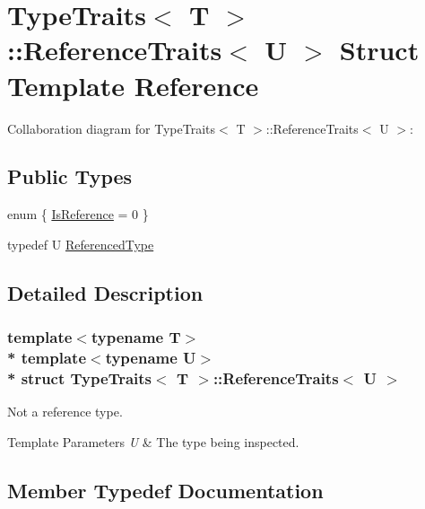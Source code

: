 \hypertarget{structTypeTraits_1_1ReferenceTraits}{}\section{Type\+Traits$<$ T $>$\+:\+:Reference\+Traits$<$ U $>$ Struct Template Reference}
\label{structTypeTraits_1_1ReferenceTraits}


Collaboration diagram for Type\+Traits$<$ T $>$\+:\+:Reference\+Traits$<$ U $>$\+:
\subsection*{Public Types}
\begin{DoxyCompactItemize}
\item 
enum \{ \hyperlink{structTypeTraits_1_1ReferenceTraits_a2ca079e379bf0e0a66c93a97e9f4097da833081f071bb2e66b80dee63c1611d26}{Is\+Reference} = 0
 \}
\item 
typedef U \hyperlink{structTypeTraits_1_1ReferenceTraits_a163b9c89cfaba740659697cc1d1fea22}{Referenced\+Type}
\end{DoxyCompactItemize}


\subsection{Detailed Description}
\subsubsection*{template$<$typename T$>$\\*
template$<$typename U$>$\\*
struct Type\+Traits$<$ T $>$\+::\+Reference\+Traits$<$ U $>$}

Not a reference type. 
\begin{DoxyTemplParams}{Template Parameters}
{\em U} & The type being inspected. \\
\hline
\end{DoxyTemplParams}


\subsection{Member Typedef Documentation}

